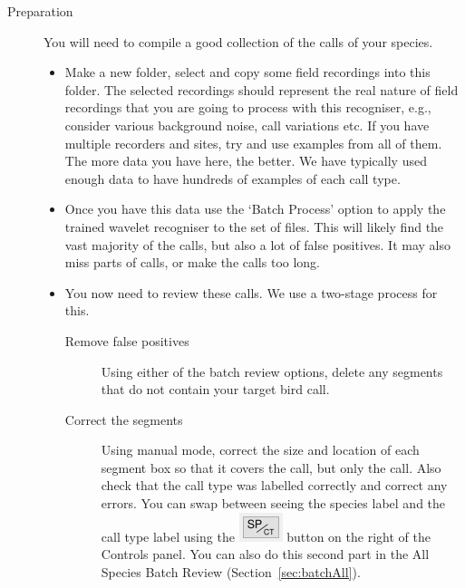 \documentclass{article}
\begin{document}
\begin{description}
\item[Preparation] You will need to compile a good collection of the calls of your species. 
\begin{itemize}
\item Make a new folder, select and copy some field recordings into this folder. The selected recordings should represent the real nature of field recordings that you are going to process with this recogniser, e.g., consider various background noise, call variations etc. If you have multiple recorders and sites, try and use examples from all of them. The more data you have here, the better. We have typically used enough data to have hundreds of examples of each call type.
\item Once you have this data use the `Batch Process' option to apply the trained wavelet recogniser to the set of files. This will likely find the vast majority of the calls, but also a lot of false positives. It may also miss parts of calls, or make the calls too long. 
\item You now need to review these calls. We use a two-stage process for this.
    \begin{description} 
    \item[Remove false positives] Using either of the batch review options, delete any segments that do not contain your target bird call. 
    \item[Correct the segments] Using manual mode, correct the size and location of each segment box so that it covers the call, but only the call. Also check that the call type was labelled correctly and correct any errors. You can swap between seeing the species label and the call type label using the \includegraphics[scale=0.5]{Figures/SPCT} button on the right of the Controls panel. You can also do this second part in the All Species Batch Review (Section~\ref{sec:batchAll}).


\end{description}
\end{itemize}
\end{description}
\end{document}
